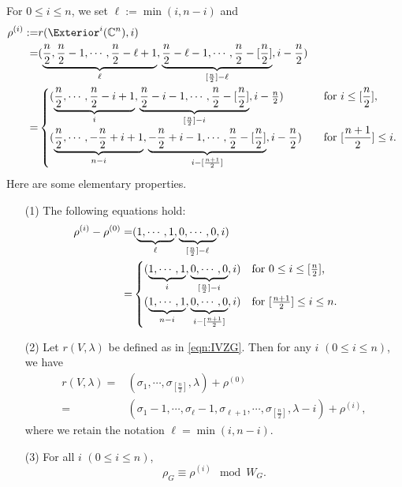 \begin{example}
\label{ex:rhoi}
For $0 \le i \le n$, 
 we set $\ell := \min(i,n-i)$
 and 
\begin{align*}
   \rho^{(i)}:=& r(\Exterior^i({\mathbb{C}}^n),i)  
\\
=&(\underbrace{\dfrac n 2, \dfrac n 2-1, \cdots, 
 \dfrac n 2-\ell+1}_\ell, 
 \underbrace{\dfrac n 2-\ell-1, \cdots, 
 \dfrac n 2-[\dfrac n 2]}_{[\frac n 2]-\ell},
 i-\frac n 2)
\\
=&\begin{cases}
(\underbrace{\dfrac n 2, \cdots, 
 \dfrac n 2-i+1}_i, 
 \underbrace{\dfrac n 2-i-1, \cdots, 
 \dfrac n 2-[\dfrac n 2]}_{[\frac n 2]-i},
 i-\frac n 2)
\quad
&\text{for $i \le [\dfrac n 2]$, }
\\[1em]
(\underbrace{\dfrac n 2, \cdots, 
 -\dfrac n 2+i+1}_{n-i}, 
 \underbrace{-\dfrac n 2+i-1, \cdots, 
 \dfrac n 2-[\dfrac n 2]}_{i-[\frac{n+1}2]},
 i-\dfrac n 2)
\quad
&\text{for $[\dfrac {n+1} 2] \le i$. }
\end{cases}
\end{align*}
Here are some elementary properties.  
\begin{enumerate}
\item[{\rm{(1)}}]
The following equations hold:
\begin{align}
\label{eqn:rhoi0}
\rho^{(i)}-\rho^{(0)}
=&
(\underbrace{1,\cdots,1}_{\ell},
 \underbrace{0,\cdots,0}_{[\frac n 2]-\ell},i)
\\
\notag
=&
\begin{cases}
(\underbrace{1,\cdots,1}_{i},
 \underbrace{0,\cdots,0}_{[\frac n 2]-i},
 i)
\quad
\text{for $0 \le i \le [\frac n 2]$, }
\\
(\underbrace{1,\cdots,1}_{n-i},
 \underbrace{0,\cdots,0}_{i-[\frac{n+1}2]},
 i)
\quad
\text{for $[\frac{n+1}2] \le i \le n$.  }
\end{cases}
\end{align}

\item[{\rm{(2)}}]
Let $r(V,\lambda)$ be defined as in \eqref{eqn:IVZG}.  
Then for any $i$ $(0 \le i \le n)$, 
 we have
\begin{align*}
r(V,\lambda)
 =&(\sigma_1, \cdots, \sigma_{[\frac n 2]}, \lambda) + \rho^{(0)}
\\
 =&(\sigma_1-1, \cdots, \sigma_{\ell}-1, \sigma_{\ell+1}, \cdots, \sigma_{[\frac n 2]}, \lambda-i) + \rho^{(i)}, 
\end{align*}
where we retain the notation $\ell = \min (i,n-i)$.  

\item[{\rm{(3)}}]
For all $i$ $(0 \le i \le n)$, 
\begin{equation}
\label{eqn:rhoiW}
   \rho_G \equiv \rho^{(i)} \mod W_G.  
\end{equation}
\end{enumerate}
\end{example}

